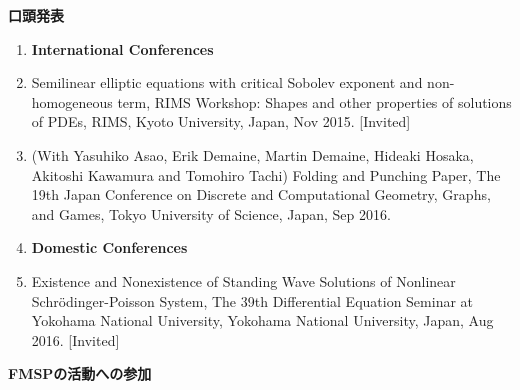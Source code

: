 \vspace{0.2cm}
\noindent
{\bf 口頭発表}

\vspace{0.1cm}

\begin{enumerate}
 \item[] {\bf International Conferences}
 \item Semilinear elliptic equations with critical Sobolev exponent and
       non-homogeneous term, RIMS Workshop: Shapes and other properties
       of solutions of PDEs, RIMS, Kyoto University, Japan, Nov 2015.
       [Invited]
 \item (With Yasuhiko Asao, Erik Demaine, Martin Demaine, Hideaki
       Hosaka, Akitoshi Kawamura and Tomohiro Tachi)
       Folding and Punching Paper, The 19th Japan Conference on Discrete
       and Computational Geometry, Graphs, and Games, Tokyo University
       of Science, Japan, Sep 2016.
 \item[] {\bf Domestic Conferences}
 \item Existence and Nonexistence of Standing Wave Solutions of
       Nonlinear Schr\"{o}dinger-Poisson System,
       The 39th Differential Equation Seminar at Yokohama National
       University, Yokohama National University, Japan, Aug 2016.
       [Invited]
\end{enumerate}

\vspace{0.2cm}
\noindent
{\bf FMSPの活動への参加}

\vspace{0.1cm}

